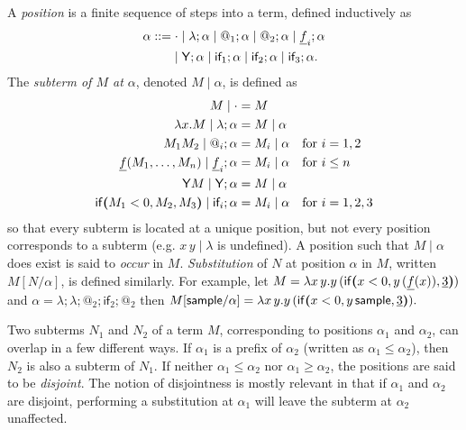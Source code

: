 A \emph{position} is a finite sequence of steps into a term, defined inductively as
\begin{align*}
\alpha ::= & \; {\cdot} \mid \lambda ; \alpha \mid @_1 ; \alpha \mid @_2 ; \alpha \mid \underline f_i ; \alpha \\
& {} \mid \mathsf{Y} ; \alpha \mid \textsf{if}_1 ; \alpha \mid \textsf{if}_2 ; \alpha \mid \textsf{if}_3 ; \alpha.
\end{align*}
The \emph{subterm of $M$ at $\alpha$}, denoted $M \mid \alpha$, is defined as
\begin{align*}
M \mid \cdot & = M \\
\lambda x. M \mid \lambda ; \alpha & = M \mid \alpha \\
M_1 M_2 \mid @_i ; \alpha & = M_i \mid \alpha \quad \text{for } i = 1,2 \\
\underline f(M_1,\dots,M_n) \mid \underline f_i ; \alpha & = M_i \mid \alpha \quad \text{for }i \leq n \\
\mathsf{Y} M \mid \mathsf{Y} ; \alpha & = M \mid \alpha \\
\mathsf{if}\boldsymbol{(}M_1 < 0, M_2, M_3\boldsymbol{)} \mid \textsf{if}_i ; \alpha & = M_i \mid \alpha \quad \text{for } i = 1,2,3
\end{align*}
so that every subterm is located at a unique position, but not every position corresponds to a subterm (e.g. $x \, y \mid \lambda$ is undefined). 
A position such that $M\mid \alpha$ does exist is said to \emph{occur} in $M$. 
\emph{Substitution} of $N$ at position $\alpha$ in $M$, written $M[N/\alpha]$, is defined similarly.
For example, let 
\(
M = \lambda x \, y. y \, (\mathsf{if}\boldsymbol{(}x < 0, y \, (\underline f (x)), \underline 3\boldsymbol{)})
\)
and
\(
\alpha =\lambda ; \lambda ; @_2 ; \textsf{if}_2 ; @_2
\)
then 
\(
M[\mathsf{sample} / \alpha] = \lambda x \, y. y \, (\mathsf{if}\boldsymbol{(}x < 0, y \, \mathsf{sample}, \underline 3\boldsymbol{)}).
\)

Two subterms $N_1$ and $N_2$ of a term $M$, corresponding to positions $\alpha_1$ and $\alpha_2$, can overlap in a few different ways. 
If $\alpha_1$ is a prefix of $\alpha_2$ (written as $\alpha_1 \leq \alpha_2$), then $N_2$ is also a subterm of $N_1$. If neither $\alpha_1 \leq \alpha_2$ nor $\alpha_1 \geq \alpha_2$, the positions are said to be \emph{disjoint}. 
The notion of disjointness is mostly relevant in that if $\alpha_1$ and $\alpha_2$ are disjoint, performing a substitution at $\alpha_1$ will leave the subterm at $\alpha_2$ unaffected.

